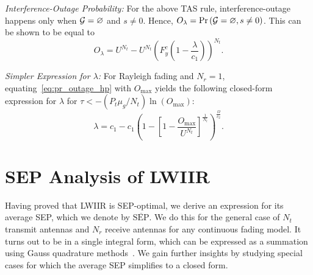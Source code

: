 \documentclass[12pt,draftcls,peerreview,onecolumn]{IEEEtran}
\newcommand{\brac}[1]{\left({#1}\right)}
\newcommand{\tendsto}{\to}
\newcommand{\prob}[1]{\text{Pr}\brac{#1}}
\newcommand{\SEP}{\text{SEP}}
\newcommand{\nx}{{0}}
\newcommand{\lam}{\lambda}
\newcommand{\mug}{{\mu_{g}}}
\newcommand{\goodset}{\cal{G}}
\newcommand{\Nt}{{N_t}}
\newcommand{\Nr}{{N_r}}
\newcommand{\Pt}{{P_t}}
\newcommand{\outmax}{O_{\text{max}}}
\newcommand{\itau}{\tau}
\newcommand{\cone}{c_{1}}
\newcommand{\ctwo}{c_{2}}
\newcommand{\out}{O}
\newcommand{\lambym}{\frac{\lam}{\cone}}
\newcommand{\al}{\ctwo}
\newcommand{\snr}{\Omega}
\newcommand{\albysnr}[1][]{\frac{\al#1}{\snr}}
\newcommand{\snrbyal}[1][]{\frac{\snr#1}{\al}}
\newcommand{\un}{U}
\newcommand{\outlam}{\out_{\lam}}
\newcommand{\avgSEP}{\overline{\SEP}}
\newcommand{\nullset}{\varnothing}
\newcommand{\ccdfyrv}[1]{ F^{c}_{y}\left(#1 \right) }
\begin{document}
{\em Interference-Outage Probability:} For the above TAS rule, interference-outage happens only when $\goodset=\nullset$ and  $s\neq\nx$. Hence,  $\outlam=\prob{{\goodset}=\nullset, s \neq 0}$. This can be shown to be equal to
\begin{equation}
\label{eq:pr_outage_hp}
\outlam = \un^{\Nt} - \un^{\Nt}\left(\ccdfyrv{1-\lambym} \right)^{\Nt}.
\end{equation}

{\em Simpler Expression for $\lam$:} For Rayleigh fading and $\Nr=1$, equating~\eqref{eq:pr_outage_hp} with $\outmax$ yields the following closed-form expression for $\lam$ for $\itau<-\left({\Pt\mug}/{\Nt}\right) \ln\left({\outmax}\right)$: 
\begin{equation}
\label{eq:lam_asym}
\lam  =  \cone - \cone\left(1 - \left[1 - \frac{\outmax}{\un^{\Nt}}\right]^{\frac{1}{\Nt}} \right)^{\snrbyal[]}.
\end{equation}
%




\section{SEP Analysis of LWIIR}
\label{sec:SEPanalysis}
 Having proved that LWIIR is SEP-optimal, we derive an expression for its average SEP, which we denote by  $\avgSEP$. We do this for the general case of $\Nt$ transmit antennas and $\Nr$ receive antennas for any continuous fading model. It turns out to be in a single integral form, which can be expressed as a summation using Gauss quadrature methods~\cite{abramowitz_stegun}. We gain further insights by studying special cases for which the average SEP simplifies to a closed form. %
 
\end{document}
